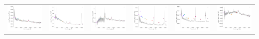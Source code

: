 \begin{center}
\begin{longtable}{l l l l l l }
    \includegraphics[width=0.3\linewidth, clip]{Figs/Figs-sdss/spec-9217-57934-0197-STRIPE82-0143-016256.pdf} & \includegraphics[width=0.3\linewidth, clip]{Figs/Figs-sdss/spec-9217-57934-0839-STRIPE82-0143-016137.pdf} & \includegraphics[width=0.3\linewidth, clip]{Figs/Figs-sdss/spec-9218-57724-0804-STRIPE82-0145-045634.pdf} & \includegraphics[width=0.3\linewidth, clip]{Figs/Figs-sdss/spec-9230-58021-0675-STRIPE82-0125-053114.pdf} & \includegraphics[width=0.3\linewidth, clip]{Figs/Figs-sdss/spec-9238-58013-0137-SPLUS-s02s09-056401.pdf} & \includegraphics[width=0.3\linewidth, clip]{Figs/Figs-sdss/spec-9239-58018-0729-STRIPE82-0136-042690.pdf} \\

\end{longtable}
\end{center}
